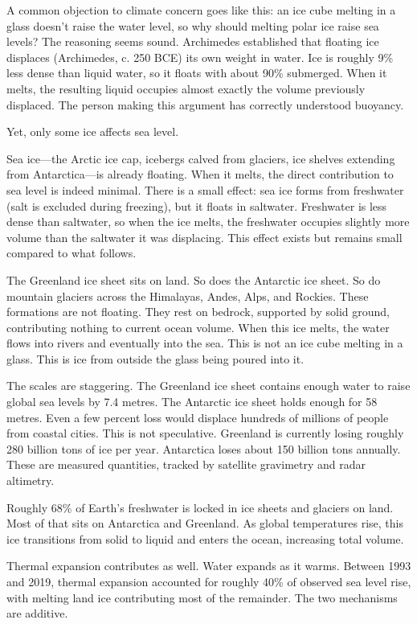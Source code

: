 \begin{commentary}
A common objection to climate concern goes like this: an ice cube melting in a glass doesn't raise the water level, so why should melting polar ice raise sea levels? The reasoning seems sound. Archimedes established that floating ice displaces (Archimedes, c. 250 BCE) its own weight in water. Ice is roughly 9\% less dense than liquid water, so it floats with about 90\% submerged. When it melts, the resulting liquid occupies almost exactly the volume previously displaced. The person making this argument has correctly understood buoyancy.

Yet, only some ice affects sea level.

Sea ice—the Arctic ice cap, icebergs calved from glaciers, ice shelves extending from Antarctica—is already floating. When it melts, the direct contribution to sea level is indeed minimal. There is a small effect: sea ice forms from freshwater (salt is excluded during freezing), but it floats in saltwater. Freshwater is less dense than saltwater, so when the ice melts, the freshwater occupies slightly more volume than the saltwater it was displacing. This effect exists but remains small compared to what follows.

The Greenland ice sheet sits on land. So does the Antarctic ice sheet. So do mountain glaciers across the Himalayas, Andes, Alps, and Rockies. These formations are not floating. They rest on bedrock, supported by solid ground, contributing nothing to current ocean volume. When this ice melts, the water flows into rivers and eventually into the sea. This is not an ice cube melting in a glass. This is ice from outside the glass being poured into it.

The scales are staggering. The Greenland ice sheet contains enough water to raise global sea levels by 7.4 metres. The Antarctic ice sheet holds enough for 58 metres. Even a few percent loss would displace hundreds of millions of people from coastal cities. This is not speculative. Greenland is currently losing roughly 280 billion tons of ice per year. Antarctica loses about 150 billion tons annually. These are measured quantities, tracked by satellite gravimetry and radar altimetry.

Roughly 68\% of Earth's freshwater is locked in ice sheets and glaciers on land. Most of that sits on Antarctica and Greenland. As global temperatures rise, this ice transitions from solid to liquid and enters the ocean, increasing total volume.

Thermal expansion contributes as well. Water expands as it warms. Between 1993 and 2019, thermal expansion accounted for roughly 40\% of observed sea level rise, with melting land ice contributing most of the remainder. The two mechanisms are additive.
\end{commentary}

